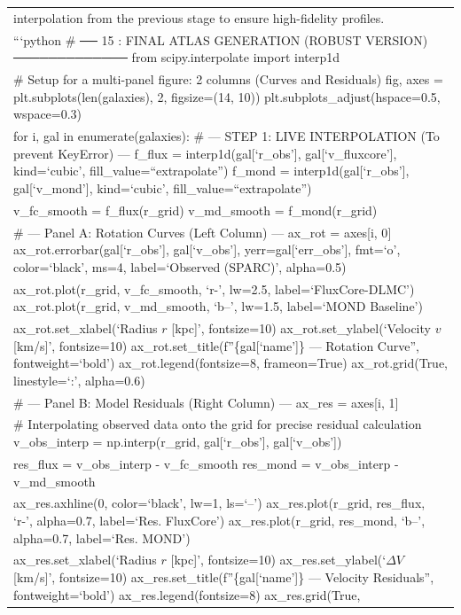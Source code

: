 \documentclass[
]{article}
\begin{document}
{\begin{longtable}[]{@{}
  >{\raggedright\arraybackslash}p{}@{}}
interpolation from the previous stage to ensure high-fidelity
profiles. \\
```python \# ── 15 : FINAL ATLAS GENERATION (ROBUST VERSION)
───────────── from scipy.interpolate import interp1d \\
\# Setup for a multi-panel figure: 2 columns (Curves and Residuals) fig,
axes = plt.subplots(len(galaxies), 2, figsize=(14, 10))
plt.subplots\_adjust(hspace=0.5, wspace=0.3) \\
for i, gal in enumerate(galaxies): \# --- STEP 1: LIVE INTERPOLATION (To
prevent KeyError) --- f\_flux = interp1d(gal{[}`r\_obs'{]},
gal{[}`v\_fluxcore'{]}, kind=`cubic', fill\_value=``extrapolate'')
f\_mond = interp1d(gal{[}`r\_obs'{]}, gal{[}`v\_mond'{]}, kind=`cubic',
fill\_value=``extrapolate'') \\
v\_fc\_smooth = f\_flux(r\_grid) v\_md\_smooth = f\_mond(r\_grid) \\
\# --- Panel A: Rotation Curves (Left Column) --- ax\_rot = axes{[}i,
0{]} ax\_rot.errorbar(gal{[}`r\_obs'{]}, gal{[}`v\_obs'{]},
yerr=gal{[}`err\_obs'{]}, fmt=`o', color=`black', ms=4, label=`Observed
(SPARC)', alpha=0.5) \\
ax\_rot.plot(r\_grid, v\_fc\_smooth, `r-', lw=2.5,
label=`FluxCore-DLMC') ax\_rot.plot(r\_grid, v\_md\_smooth, `b--',
lw=1.5, label=`MOND Baseline') \\
ax\_rot.set\_xlabel(`Radius \(r\) {[}kpc{]}', fontsize=10)
ax\_rot.set\_ylabel(`Velocity \(v\) {[}km/s{]}', fontsize=10)
ax\_rot.set\_title(f''\{gal{[}`name'{]}\} --- Rotation Curve'',
fontweight=`bold') ax\_rot.legend(fontsize=8, frameon=True)
ax\_rot.grid(True, linestyle=`:', alpha=0.6) \\
\# --- Panel B: Model Residuals (Right Column) --- ax\_res = axes{[}i,
1{]} \\
\# Interpolating observed data onto the grid for precise residual
calculation v\_obs\_interp = np.interp(r\_grid, gal{[}`r\_obs'{]},
gal{[}`v\_obs'{]}) \\
res\_flux = v\_obs\_interp - v\_fc\_smooth res\_mond = v\_obs\_interp -
v\_md\_smooth \\
ax\_res.axhline(0, color=`black', lw=1, ls=`--') ax\_res.plot(r\_grid,
res\_flux, `r-', alpha=0.7, label=`Res. FluxCore') ax\_res.plot(r\_grid,
res\_mond, `b--', alpha=0.7, label=`Res. MOND') \\
ax\_res.set\_xlabel(`Radius \(r\) {[}kpc{]}', fontsize=10)
ax\_res.set\_ylabel(`\(\Delta V\) {[}km/s{]}', fontsize=10)
ax\_res.set\_title(f''\{gal{[}`name'{]}\} --- Velocity Residuals'',
fontweight=`bold') ax\_res.legend(fontsize=8) ax\_res.grid(True,

\end{longtable}}
\end{document}

